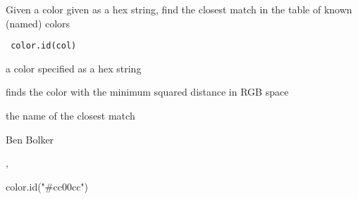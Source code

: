 \begin{Description}\relax
Given a color given as a hex string, find the closest match in the
table of known (named) colors
\end{Description}
\begin{Usage}
\begin{verbatim}
 color.id(col)
\end{verbatim}
\end{Usage}
\begin{Arguments}
\begin{ldescription}
\item[\code{col}] a color specified as a hex string
\end{ldescription}
\end{Arguments}
\begin{Details}\relax
finds the color with the minimum squared distance in RGB space
\end{Details}
\begin{Value}
the name of the closest match
\end{Value}
\begin{Author}\relax
Ben Bolker
\end{Author}
\begin{SeeAlso}\relax
{},
\end{SeeAlso}
\begin{Examples}
\begin{ExampleCode}
 color.id("#cc00cc")
\end{ExampleCode}
\end{Examples}

